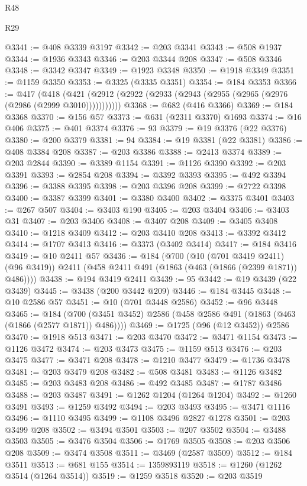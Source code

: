 \begin{lexlean}{R48}
\begin{lexlean}{R29}
\begin{coremodule}
{{{{{{{{{{{{{{{{{{{{{{{{{{{{{{{{{{{{{{{{{{{{{{{{{{{{{{{{{{{{{{{{{{{{{{{{{{{{{{{{{{{{{{{{{{{{{{{{{{{{{{{{{{{{{{{{{{{{{{{{{{{{{{{{{{{{{{{{{{{{{{{{{{{{{{{{{{{{{{{{{{{{{{{{{{{{{{{{{{{{{{{{{{{{{{{{{{{{{{{{{{{{{{{{{{{{{{{{{{@3341 := @408 @3339 @3197
@3342 := @203 @3341
@3343 := @508 @1937
@3344 := @1936 @3343
@3346 := @203 @3344 @208
@3347 := @508 @3346
@3348 := @3342 @3347
@3349 := @1923 @3348
@3350 := @1918 @3349
@3351 := @1159 @3350
@3353 := @3325 (@3335 @3351)
@3354 := @184 @3353
@3366 := @417
    (@418 (@421 (@2912 (@2922 (@2933 (@2943 (@2955 (@2965 (@2976 (@2986 (@2999 @3010)))))))))))
@3368 := @682 (@416 @3366)
@3369 := @184 @3368
@3370 := @156 @57
@3373 := @631 (@2311 @3370) @1693
@3374 := @16 @406
@3375 := @401 @3374
@3376 := 93
@3379 := @19 @3376 (@22 @3376)
@3380 := @200 @3379
@3381 := 94
@3384 := @19 @3381 (@22 @3381)
@3386 := @408 @3384 @208
@3387 := @203 @3386
@3388 := @2413 @3374
@3389 := @203 @2844
@3390 := @3389 @1154
@3391 := @1126 @3390
@3392 := @203 @3391
@3393 := @2854 @208
@3394 := @3392 @3393
@3395 := @492 @3394
@3396 := @3388 @3395
@3398 := @203 @3396 @208
@3399 := @2722 @3398
@3400 := @3387 @3399
@3401 := @3380 @3400
@3402 := @3375 @3401
@3403 := @267 @507
@3404 := @3403 @190
@3405 := @203 @3404
@3406 := @3403 @31
@3407 := @203 @3406
@3408 := @3407 @208
@3409 := @3405 @3408
@3410 := @1218 @3409
@3412 := @203 @3410 @208
@3413 := @3392 @3412
@3414 := @1707 @3413
@3416 := @3373 (@3402 @3414)
@3417 := @184 @3416
@3419 := @10 @2411 @57
@3436 := @184
    (@700
      (@10 (@701 @3419 @2411) (@96 @3419))
      @2411
      (@458 @2411 @491 (@1863 (@463 (@1866 (@2399 @1871)) @486))))
@3438 := @194 @3419 @2411
@3439 := 95
@3442 := @19 @3439 (@22 @3439)
@3445 := @3438 (@200 @3442 @209)
@3446 := @184 @3445
@3448 := @10 @2586 @57
@3451 := @10 (@701 @3448 @2586)
@3452 := @96 @3448
@3465 := @184 (@700 (@3451 @3452) @2586 (@458 @2586 @491 (@1863 (@463 (@1866 (@2577 @1871)) @486))))
@3469 := @1725 (@96 (@12 @3452)) @2586
@3470 := @1918 @513
@3471 := @203 @3470
@3472 := @3471 @1154
@3473 := @1126 @3472
@3474 := @203 @3473
@3475 := @1159 @513
@3476 := @203 @3475
@3477 := @3471 @208
@3478 := @1210 @3477
@3479 := @1736 @3478
@3481 := @203 @3479 @208
@3482 := @508 @3481
@3483 := @1126 @3482
@3485 := @203 @3483 @208
@3486 := @492 @3485
@3487 := @1787 @3486
@3488 := @203 @3487
@3491 := @1262 @1204 (@1264 @1204)
@3492 := @1260 @3491
@3493 := @1259 @3492
@3494 := @203 @3493
@3495 := @3471 @1116
@3496 := @1110 @3495
@3499 := @1108 @3496 @2827 @1278
@3501 := @203 @3499 @208
@3502 := @3494 @3501
@3503 := @207 @3502
@3504 := @3488 @3503
@3505 := @3476 @3504
@3506 := @1769 @3505
@3508 := @203 @3506 @208
@3509 := @3474 @3508
@3511 := @3469 (@2587 @3509)
@3512 := @184 @3511
@3513 := @681 @155
@3514 := 1359893119
@3518 := @1260 (@1262 @3514 (@1264 @3514))
@3519 := @1259 @3518
@3520 := @203 @3519
}}}}}}}}}}}}}}}}}}}}}}}}}}}}}}}}}}}}}}}}}}}}}}}}}}}}}}}}}}}}}}}}}}}}}}}}}}}}}}}}}}}}}}}}}}}}}}}}}}}}}}}}}}}}}}}}}}}}}}}}}}}}}}}}}}}}}}}}}}}}}}}}}}}}}}}}}}}}}}}}}}}}}}}}}}}}}}}}}}}}}}}}}}}}}}}}}}}}}}}}}}}}}}}}}}}}}}}}}}
\end{coremodule}
\end{lexlean}
\end{lexlean}
